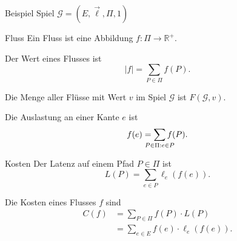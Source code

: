 \documentclass{beamer}
\begin{document}
\begin{frame}{Beispiel}
	Spiel $\mathcal G = (E, \vec{\ell}, \Pi, 1)$
	\begin{figure}
	\end{figure}
\end{frame}

\begin{frame}{Fluss}
	Ein \alert{Fluss} ist eine Abbildung $f: \Pi \to \mathbb R^+$. 
	
	Der \alert{Wert} eines Flusses ist \[ |{f}| = \sum_{P \in \Pi} f(P) . \]
	
	Die Menge aller Flüsse mit Wert $v$ im Spiel $\mathcal G$ ist $F(\mathcal G, v)$.
	
	Die \alert{Auslastung} an einer Kante $e$ ist \[ f(e) = \sum_{\mathclap{P \in \Pi: e \in P}} f(P) . \]
\end{frame}

\begin{frame}{Kosten}
	Der \alert{Latenz} auf einem Pfad $P \in \Pi$ ist
	\[ L(P) = \sum_{e \in P} \ell_e\left(f\left(e\right)\right). \]
	
	Die \alert{Kosten} eines Flusses $f$ sind
	\begin{align*}
		C(f) &= \sum_{P \in \Pi} f(P) \cdot L(P) \\
			&= \sum_{e \in E} f(e) \cdot \ell_e\left(f\left(e\right)\right). 
	\end{align*} 
\end{frame}
\end{document}
